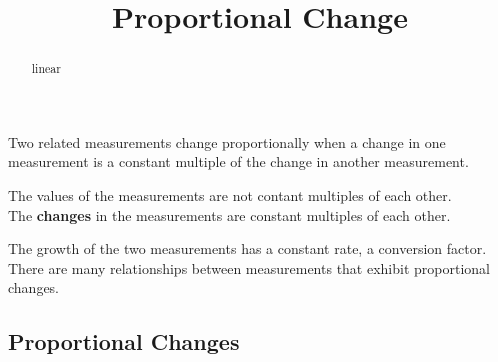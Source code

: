 \documentclass{ximera}
\title{Proportional Change}
\begin{document}
\begin{abstract}
linear
\end{abstract}
\maketitle



Two related measurements change proportionally when a change in one measurement is a constant multiple of the change in another measurement. \\

\begin{warning}

The values of the measurements are not contant multiples of each other. \\


The \textbf{\textcolor{red!70!black}{changes}} in the measurements are constant multiples of each other.

\end{warning}


The growth of the two measurements has a constant rate, a conversion factor. \\



There are many relationships between measurements that exhibit proportional changes.  







\subsection*{Proportional Changes}
\end{document}
